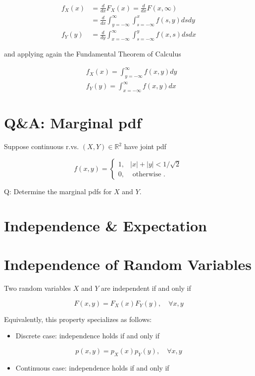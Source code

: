 \documentclass[10pt]{article}
\begin{document}
$$
\begin{aligned}
f_{X}(x) & =\frac{d}{d x} F_{X}(x)=\frac{d}{d x} F(x, \infty) \\
& =\frac{d}{d x} \int_{y=-\infty}^{\infty} \int_{s=-\infty}^{x} f(s, y) d s d y \\
f_{Y}(y) & =\frac{d}{d y} \int_{x=-\infty}^{\infty} \int_{s=-\infty}^{y} f(x, s) d s d x
\end{aligned}
$$

and applying again the Fundamental Theorem of Calculus

$$
\begin{aligned}
& f_{X}(x)=\int_{y=-\infty}^{\infty} f(x, y) d y \\
& f_{Y}(y)=\int_{x=-\infty}^{\infty} f(x, y) d x
\end{aligned}
$$

\section*{Q\&A: Marginal pdf}
Suppose continuous r.vs. $(X, Y) \in \mathbb{R}^{2}$ have joint pdf

$$
f(x, y)= \begin{cases}1, & |x|+|y|<1 / \sqrt{2} \\ 0, & \text { otherwise } .\end{cases}
$$

Q: Determine the marginal pdfs for $X$ and $Y$.

\section*{Independence \& Expectation}
\section*{Independence of Random Variables}
Two random variables $X$ and $Y$ are independent if and only if

$$
F(x, y)=F_{X}(x) F_{Y}(y), \quad \forall x, y
$$

Equivalently, this property specializes as follows:

\begin{itemize}
  \item Discrete case: independence holds if and only if
\end{itemize}

$$
p(x, y)=p_{X}(x) p_{Y}(y), \quad \forall x, y
$$

\begin{itemize}
  \item Continuous case: independence holds if and only if
\end{itemize}
\end{document}
